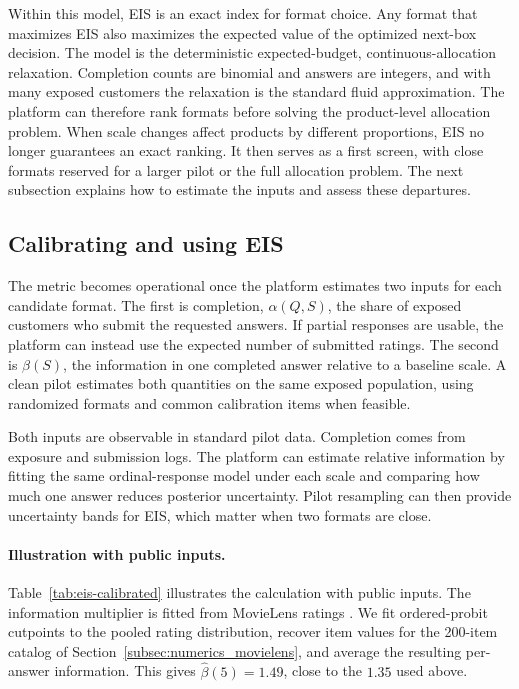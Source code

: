 \documentclass[11pt]{article}
\theoremstyle{definition}
\theoremstyle{remark}
\newcommand{\1}{\mathbf{1}}
\begin{document}
Within this model, EIS is an exact index for format choice. Any format
that maximizes EIS also maximizes the expected value of the optimized
next-box decision. The model is the deterministic expected-budget,
continuous-allocation relaxation. Completion counts are binomial and
answers are integers, and with many exposed customers the relaxation is
the standard fluid approximation. The platform can therefore rank formats before solving the
product-level allocation problem. When scale changes affect products by
different proportions, EIS no longer guarantees an exact ranking. It
then serves as a first screen, with close formats reserved for a larger
pilot or the full allocation problem. The next subsection explains how
to estimate the inputs and assess these departures.

\subsection{Calibrating and using EIS}
\label{subsec:eis-practical}

The metric becomes operational once the platform estimates two inputs
for each candidate format. The first is completion,
\(\alpha(Q,S)\), the share of exposed customers who submit the requested
answers. If partial responses are usable, the platform can instead use
the expected number of submitted ratings. The second is \(\beta(S)\),
the information in one completed answer relative to a baseline scale. A
clean pilot estimates both quantities on the same exposed population,
using randomized formats and common calibration items when feasible.

Both inputs are observable in standard pilot data. Completion comes from
exposure and submission logs. The platform can estimate relative
information by fitting the same ordinal-response model under each scale
and comparing how much one answer reduces posterior uncertainty. Pilot
resampling can then provide uncertainty bands for EIS, which matter when
two formats are close.

\paragraph{Illustration with public inputs.}
Table~\ref{tab:eis-calibrated} illustrates the calculation with public
inputs. The information multiplier is fitted from
MovieLens ratings \citep{HarperKonstan2016}. We fit ordered-probit
cutpoints to the pooled rating distribution, recover item values for
the 200-item catalog of Section~\ref{subsec:numerics_movielens}, and
average the resulting per-answer information. This gives \(\hat\beta(5)=1.49\), close to the \(1.35\) used above.
\end{document}

